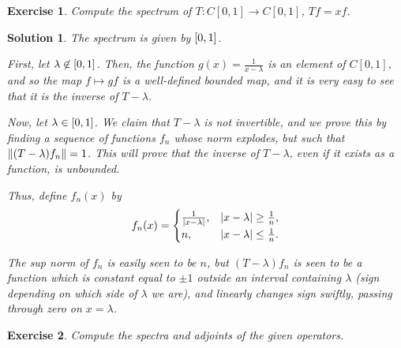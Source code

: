 \documentclass{article}
\newtheorem{ex}{Exercise}
\theoremstyle{nonumberplain}
\newtheorem{sol}{Solution}
\DeclarePairedDelimiter{\abs}{\lvert}{\rvert}
\DeclarePairedDelimiter{\Norm}{\lVert}{\rVert}
\begin{document}
\begin{ex}
Compute the spectrum of $T \colon C[0,1] \to C[0,1]$, $Tf = xf$.
\end{ex}

\begin{sol}
The spectrum is given by $\interval01$.

First, let $\lambda \not \in \interval01$. Then, the function $g(x) = \frac1{x-\lambda}$ is an element of $C[0,1]$, and so the map $f \mapsto gf$ is a well-defined bounded map, and it is very easy to see that it is the inverse of $T-\lambda$.

Now, let $\lambda \in \interval01$. We claim that $T-\lambda$ is not invertible, and we prove this by finding a sequence of functions $f_n$ whose norm explodes, but such that $\Norm{(T-\lambda)f_n} = 1$. This will prove that the inverse of $T-\lambda$, even if it exists as a function, is unbounded.

Thus, define $f_n(x)$ by
\begin{equation}
f_n(x) = \begin{cases}
\frac1{\abs{x-\lambda}}, & \abs{x-\lambda}\geq\frac1n,\\
n, & \abs{x-\lambda}\leq\frac1n.
\end{cases}
\end{equation}

The sup norm of $f_n$ is easily seen to be $n$, but $(T-\lambda)f_n$ is seen to be a function which is constant equal to $\pm1$ outside an interval containing $\lambda$ (sign depending on which side of $\lambda$ we are), and linearly changes sign swiftly, passing through zero on $x = \lambda$.
\end{sol}

\begin{ex}
Compute the spectra and adjoints of the given operators.
\end{ex}
\end{document}
